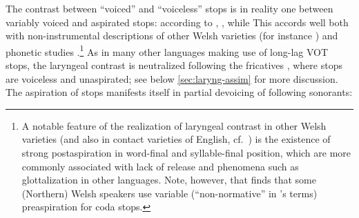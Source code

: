\begin{table}[htp]
  \centering
{}
  \caption{Pembrokeshire Welsh consonants: the phonetic inventory}
  \label{tab:pw-consonans}
\end{table}

The contrast between \enquote{voiced} and \enquote{voiceless} stops is in reality one between variably voiced and aspirated stops: according to \citet[p.~13]{awbery86:_pembr_welsh}, , while  This accords well both with non-instrumental descriptions of other Welsh varieties (\cf for instance \citealt{thomas61:_ffonem_dyffr_wysg,jones,brycheiniog}) and phonetic studies \citep{ball-phon,ball01:_welsh_phonet}.\footnote{A notable feature of the realization of laryngeal contrast in other Welsh varieties (and also in contact varieties of English, cf.\ \citealt{walters03:_celtic_englis}) is the existence of strong postaspiration in word-final and syllable-final position, which are more commonly associated with lack of release and phenomena such as glottalization in other languages. Note, however, that \citet{morris10:_phonet_north_wales} finds that some (Northern) Welsh speakers use variable (\ie \enquote{non\hyp normative} in \citeauthor{helgason}'s \citeyear{helgason} terms) preaspiration for coda stops.} As in many other languages making use of long-lag VOT stops, the laryngeal contrast is neutralized following the fricatives \ipa{[s]}, where stops are voiceless and unaspirated; see below \cref{sec:laryng-assim} for more discussion. The aspiration of stops manifests itself in partial devoicing of following sonorants:


